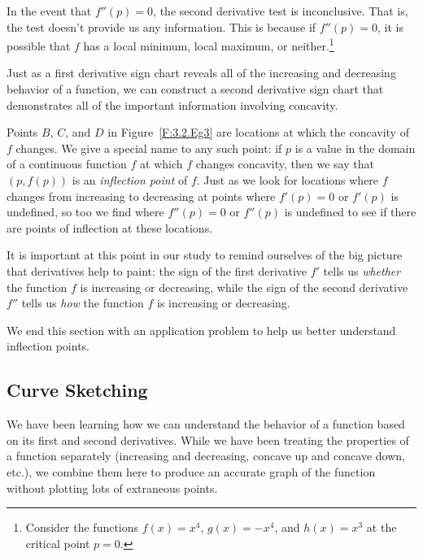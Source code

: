 In the event that $f''(p) = 0$, the second derivative test is inconclusive.  That is, the test doesn't provide us any information.  This is because if $f''(p) = 0$, it is possible that $f$ has a local minimum, local maximum, or neither.\footnote{Consider the functions $f(x) = x^4$, $g(x) = -x^4$, and $h(x) = x^3$ at the critical point $p = 0$.}

Just as a first derivative sign chart reveals all of the increasing and decreasing behavior of a function, we can construct a second derivative sign chart that demonstrates all of the important information involving concavity.


Points $B$, $C$, and $D$ in Figure~\ref{F:3.2.Eg3} are locations at which the concavity of $f$ changes.  We give a special name to any such point:  if $p$ is a value in the domain of a continuous function $f$ at which $f$ changes concavity, then we say that $(p,f(p))$ is an \emph{inflection point}  of $f$.  Just as we look for locations where $f$ changes from increasing to decreasing at points where $f'(p) = 0$ or $f'(p)$ is undefined, so too we find where $f''(p) = 0$ or $f''(p)$ is undefined to see if there are points of inflection at these locations.

It is important at this point in our study to remind ourselves of the big picture that derivatives help to paint:  the sign of the first derivative $f'$ tells us \emph{whether} the function $f$ is increasing or decreasing, while the sign of the second derivative $f''$ tells us \emph{how} the function $f$ is increasing or decreasing. \pagebreak


We end this section with an application problem to help us better understand inflection points.


\subsection{Curve Sketching}

We have been learning how we can understand the behavior of a function based on its first and second derivatives. While we have been treating the properties of a function separately (increasing and decreasing, concave up and concave down, etc.), we combine them here to produce an accurate graph of the function without plotting lots of extraneous points.

